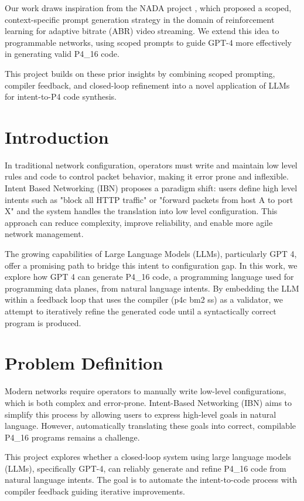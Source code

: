 \documentclass[sigconf]{acmart}
\begin{document}
Our work draws inspiration from the NADA project \cite{nada}, which proposed a scoped, context-specific prompt generation strategy in the domain of reinforcement learning for adaptive bitrate (ABR) video streaming. We extend this idea to programmable networks, using scoped prompts to guide GPT-4 more effectively in generating valid P4\_16 code.

This project builds on these prior insights by combining scoped prompting, compiler feedback, and closed-loop refinement into a novel application of LLMs for intent-to-P4 code synthesis.


\section{Introduction}
In traditional network configuration, operators must write and maintain low level rules and code to control packet behavior, making it error prone and inflexible. Intent Based Networking (IBN) proposes a paradigm shift: users define high level intents such as "block all HTTP traffic" or "forward packets from host A to port X" and the system handles the translation into low level configuration. This approach can reduce complexity, improve reliability, and enable more agile network management.

The growing capabilities of Large Language Models (LLMs), particularly GPT 4, offer a promising path to bridge this intent to configuration gap. In this work, we explore how GPT 4 can generate P4\_16 code, a programming language used for programming data planes, from natural language intents. By embedding the LLM within a feedback loop that uses the compiler (p4c bm2 ss) as a validator, we attempt to iteratively refine the generated code until a syntactically correct program is produced.
 

\section{Problem Definition}
Modern networks require operators to manually write low-level configurations, which is both complex and error-prone. Intent-Based Networking (IBN) aims to simplify this process by allowing users to express high-level goals in natural language. However, automatically translating these goals into correct, compilable P4\_16 programs remains a challenge.

This project explores whether a closed-loop system using large language models (LLMs), specifically GPT-4, can reliably generate and refine P4\_16 code from natural language intents. The goal is to automate the intent-to-code process with compiler feedback guiding iterative improvements.
\end{document}
